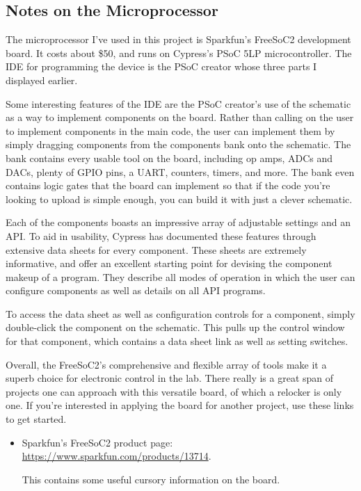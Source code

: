 \documentclass[10pt]{report}
\begin{document}
\begin{appendices}
\section{Notes on the Microprocessor}\label{app:resources}

The microprocessor I've used in this project is Sparkfun's FreeSoC2 development board. It costs about \$50, and runs on Cypress's PSoC 5LP microcontroller. The IDE for programming the device is the PSoC creator whose three parts I displayed earlier.

Some interesting features of the IDE are the PSoC creator's use of the schematic as a way to implement components on the board. Rather than calling on the user to implement components in the main code, the user can implement them by simply dragging components from the components bank onto the schematic. The bank contains every usable tool on the board, including op amps, ADCs and DACs, plenty of GPIO pins, a UART, counters, timers, and more. The bank even contains logic gates that the board can implement so that if the code you're looking to upload is simple enough, you can build it with just a clever schematic.

Each of the components boasts an impressive array of adjustable settings and an API. To aid in usability, Cypress has documented these features through extensive data sheets for every component. These sheets are extremely informative, and offer an excellent starting point for devising the component makeup of a program. They describe all modes of operation in which the user can configure components as well as details on all API programs. 

To access the data sheet as well as configuration controls for a component, simply double-click the component on the schematic. This pulls up the control window for that component, which contains a data sheet link as well as setting switches.

Overall, the FreeSoC2's comprehensive and flexible array of tools make it a superb choice for electronic control in the lab. There really is a great span of projects one can approach with this versatile board, of which a relocker is only one. If you're interested in applying the board for another project, use these links to get started.
\begin{itemize}
    \item Sparkfun's FreeSoC2 product page: \url{https://www.sparkfun.com/products/13714}.
    
    This contains some useful cursory information on the board.
    

\end{itemize}
\end{appendices}
\end{document}
